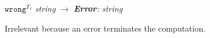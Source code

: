 \begin{case}
$\mathtt{wrong}^{T_{1}}$ \emph{string} $\rightarrow$ \emph{\textbf{Error}: string}

Irrelevant because an error terminates the computation.
\end{case}